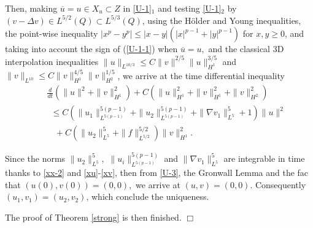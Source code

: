 \documentclass[11pt,reqno]{amsart}%
\numberwithin{equation}{section}
\begin{document}
{Then, making $\overline{u}=u\in X_u\subset Z$ in \eqref{U-1}$_1$ and testing \eqref{U-1}$_2$ by $(v-\Delta v)\in L^{5/2}(Q)\subset L^{5/3}(Q)$, using the H\"older and Young inequalities, the point-wise inequality $|x^p-y^p|\le |x-y|(|x|^{p-1}+|y|^{p-1})$ for $x,y\ge0$, and taking into account the sign of (\ref{U-1-1}) when $\overline{u}=u,$ and the classical 3D interpolation inequalities 
$\|u\|_{L^{10/3}}\le C\|v\|^{2/5}\|u\|^{3/5}_{H^1}$ and 
$\|v\|_{L^{10}}\le C\|v\|_{H^1}^{4/5}\|v\|^{1/5}_{H^2}$, we arrive at the time differential inequality
\begin{eqnarray}\label{U-3}
&&\frac{d}{dt}\left(\|u\|^2+\|v\|^2_{H^1}\right)+C\left(\|u\|^2_{H^1}+\|v\|^2_{H^1}+\|v\|^2_{H^2}\right)\nonumber\\
&&\  \ \le C\!\left(\|u_1\|_{L^{5(p-1)}}^{5(p-1)}+\|u_2\|_{L^{5(p-1)}}^{5(p-1)}
+\|\nabla v_1\|_{L^5}^5+1\right)\|u\|^2\nonumber\\
&&\ \  \ \ +C\left(\|u_2\|^5_{L^5}+\|f\|^{5/2}_{L^{5/2}}\right)\|v\|^2_{H^1}.
\end{eqnarray}

Since the norms 
$\|u_2\|^5_{L^5}, $  $\|u_i\|^{5(p-1)}_{L^{5(p-1)}} $ and $\|\nabla v_1\|_{L^5}^5$   are integrable in time
 thanks to \eqref{xx-2} and \eqref{xu}-\eqref{xv}, then   from \eqref{U-3}, the Gronwall Lemma and the fac that $(u(0),v(0))=(0,0),$ we arrive at $(u,v)=(0,0)$. Consequently $(u_1,v_1)=(u_2,v_2)$, which conclude the uniqueness. 



The proof of Theorem \ref{strong} is then finished. \hfill$\Box$

}
\end{document}

